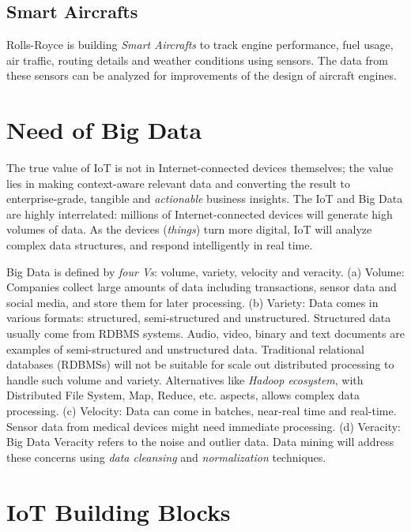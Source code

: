 \documentclass[sigconf]{acmart}
\begin{document}
	\subsection{Smart Aircrafts}
	
	Rolls-Royce is building {\em Smart Aircrafts} to track engine performance, fuel usage, air traffic, routing details and weather conditions using sensors. The data from these sensors can be analyzed for improvements of the design of aircraft engines\cite{smart-aircraft}.
	
	\section{Need of Big Data}
	
	The true value of IoT is not in Internet-connected devices themselves; the value lies in making context-aware relevant data and converting the result to enterprise-grade, tangible and {\em actionable} business insights. The IoT and Big Data are highly interrelated: millions of Internet-connected devices will generate high volumes of data. As the devices ({\em things}) turn more digital, IoT will analyze complex data structures, and respond intelligently in real time. 
	
	Big Data is defined by {\em four Vs}: volume, variety, velocity and veracity\cite{big-data}. (a) Volume: Companies collect large amounts of data including transactions, sensor data and social media, and store them for later processing. (b) Variety: Data comes in various formats: structured, semi-structured and unstructured. Structured data usually come from RDBMS systems. Audio, video, binary and text documents are examples of semi-structured and unstructured data. Traditional relational databases (RDBMSs) will not be suitable for scale out distributed processing to handle such volume and variety. Alternatives like {\em Hadoop ecosystem}, with Distributed File System, Map, Reduce, etc. aspects, allows complex data processing. (c) Velocity: Data can come in batches, near-real time and real-time. Sensor data from medical devices might need immediate processing. (d) Veracity: Big Data Veracity refers to the noise and outlier data. Data mining will address these concerns using {\em data cleansing} and {\em normalization} techniques.
	

	\section{IoT Building Blocks}
	
\end{document}
